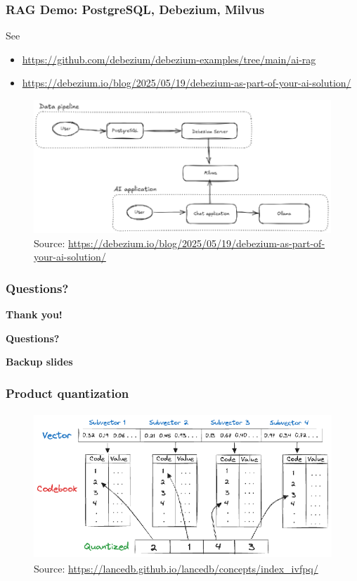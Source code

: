 \documentclass[10pt,utf8]{beamer}
\begin{document}
\begin{frame}
    \frametitle{RAG Demo: PostgreSQL, Debezium, Milvus}
    See
    \begin{itemize}
        \color{blue} \footnotesize
        \item \url{https://github.com/debezium/debezium-examples/tree/main/ai-rag}
        \item \url{https://debezium.io/blog/2025/05/19/debezium-as-part-of-your-ai-solution/}
        \color{black}
    \end{itemize}
    \begin{figure}
        \centering
        \includegraphics[height=5cm]{./img/dbz_milvus_demo.eps}
        \caption{\tiny{Source: \url{https://debezium.io/blog/2025/05/19/debezium-as-part-of-your-ai-solution/}}}
    \end{figure}
\end{frame}

\begin{frame}
    \frametitle{Questions?}
    \centering
     \textbf{\Huge{Thank you!}}
    
    \vspace{1.5cm}
    
    \textbf{\Huge{Questions?}}
    
    \vspace{1cm}
\end{frame}


\begin{frame}
    \centering
    \huge{\textbf{Backup slides}}
\end{frame}

\begin{frame}
    \frametitle{Product quantization}
    \begin{figure}
        \centering
        \includegraphics[height=5.5cm]{./img/product_quantization.eps}
        \caption{\tiny{Source: \url{https://lancedb.github.io/lancedb/concepts/index_ivfpq/}}}
    \end{figure}
\end{frame}
\end{document}
